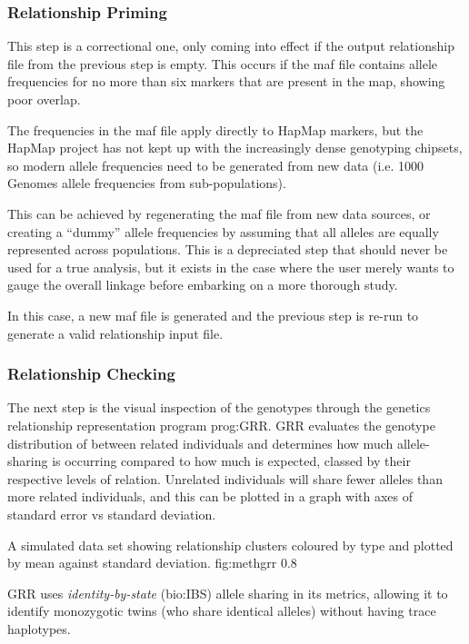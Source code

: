 \subsubsection{Relationship Priming}

This step is a correctional one, only coming into effect if the output relationship file from the previous step is empty. This occurs if the maf file contains allele frequencies for no more than six markers that are present in the map, showing poor overlap.

The frequencies in the maf file apply directly to HapMap markers, but the HapMap project has not kept up with the increasingly dense genotyping chipsets, so modern allele frequencies need to be generated from new data (i.e. 1000 Genomes allele frequencies from sub-populations).

This can be achieved by regenerating the maf file from new data sources, or creating a “dummy” allele frequencies by assuming that all alleles are equally represented across populations. This is a depreciated step that should never be used for a true analysis, but it exists in the case where the user merely wants to gauge the overall linkage before embarking on a more thorough study.

In this case, a new maf file is generated and the previous step is re-run to generate a valid relationship input file.

\subsubsection{Relationship Checking}

The next step is the visual inspection of the genotypes through the genetics relationship representation program \gls{prog:GRR}. GRR evaluates the genotype distribution of between related individuals and determines how much allele-sharing is occurring compared to how much is expected, classed by their respective levels of relation. Unrelated individuals will share fewer alleles than more related individuals, and this can be plotted in a graph with axes of standard error vs standard deviation. 

	{A simulated data set showing relationship clusters coloured by type and plotted by mean against standard deviation.}
	{fig:methgrr}
	{0.8}
	
GRR uses \textit{identity-by-state} (\gls{bio:IBS}) allele sharing in its metrics, allowing it to identify monozygotic twins (who share identical alleles) without having trace haplotypes. 

